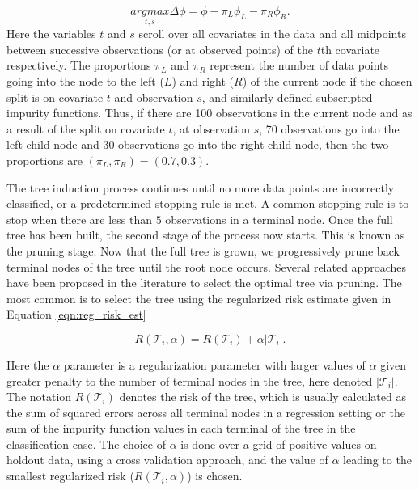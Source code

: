 \begin{equation}
\underset{t,s}{argmax} \Delta\phi = \phi - \pi_L\phi_L-\pi_R\phi_R.
\end{equation}
Here the variables $t$ and $s$ scroll over all covariates in the data and all midpoints between successive observations (or at observed points) of the $t$th covariate respectively. The proportions $\pi_L$ and $\pi_R$ represent the number of data points going into the node to the left ($L$) and right ($R$) of the current node if the chosen split is on covariate $t$ and observation $s$, and similarly defined subscripted impurity functions. Thus, if there are 100 observations in the current node and as a result of the split on covariate $t$, at observation $s$, 70 observations go into the left child node and 30 observations go into the right child node, then the two proportions are $(\pi_L, \pi_R) = (0.7, 0.3)$. 

The tree induction process continues until no more data points are incorrectly classified, or a predetermined stopping rule is met. A common stopping rule is to stop when there are less than $5$ observations in a terminal node. Once the full tree has been built, the second stage of the process now starts. This is known as the pruning stage. Now that the full tree is grown, we progressively prune back terminal nodes of the tree until the root node occurs. Several related approaches have been proposed in the literature to select the optimal tree via pruning. The most common is to select the tree using the regularized risk estimate given in Equation \ref{eqn:reg_risk_est} 

\begin{equation}\label{eqn:reg_risk_est}
R(\mathcal{T}_i,\alpha) = R(\mathcal{T}_i) + \alpha \vert \mathcal{T}_i \vert. 
\end{equation}

Here the $\alpha$ parameter is a regularization parameter with larger values of $\alpha$ given greater penalty to the number of terminal nodes in the tree, here denoted $\vert \mathcal{T}_i\vert$. The notation $R(\mathcal{T}_i)$ denotes the risk of the tree, which is usually calculated as the sum of squared errors across all terminal nodes in a regression setting or the sum of the impurity function values in each terminal of the tree in the classification case. The choice of $\alpha$ is done over a grid of positive values on holdout data, using a cross validation approach, and the value of $\alpha$ leading to the smallest regularized risk ($R(\mathcal{T}_i,\alpha)$) is chosen.  

